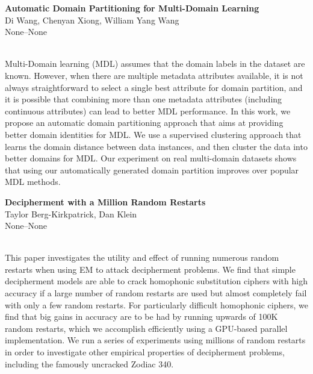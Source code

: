 \documentclass[twoside,makeidx]{book}
\begin{document}
\par\vspace{2em}\noindent%
\begin{minipage}{\linewidth}%
\begin{center}
\textbf{\normalsize Automatic Domain Partitioning for Multi-Domain Learning}\\
\normalsize  Di Wang,  Chenyan Xiong,  William Yang Wang\\
{\small None--None}\\
\end{center}
\end{minipage}\\[0.5em]
\nopagebreak%
\noindent%
{\small Multi-Domain learning (MDL) assumes that the domain labels in the dataset are known. However, when there are multiple metadata attributes available, it is not always straightforward to select a single best attribute for domain partition, and it is possible that combining more than one metadata attributes (including continuous attributes) can lead to better MDL performance. In this work, we propose an automatic domain partitioning approach that aims at providing better domain identities for MDL. We use a supervised clustering approach that learns the domain distance between data instances, and then cluster the data into better domains for MDL. Our experiment on real multi-domain datasets shows that using our automatically generated domain partition improves over popular MDL methods.}
\par\vspace{2em}\noindent%
\begin{minipage}{\linewidth}%
\begin{center}
\textbf{\normalsize Decipherment with a Million Random Restarts}\\
\normalsize  Taylor Berg-Kirkpatrick,  Dan Klein\\
{\small None--None}\\
\end{center}
\end{minipage}\\[0.5em]
\nopagebreak%
\noindent%
{\small This paper investigates the utility and effect of running numerous random restarts when using EM to attack decipherment problems. We find that simple decipherment models are able to crack homophonic substitution ciphers with high accuracy if a large number of random restarts are used but almost completely fail with only a few random restarts. For particularly difficult homophonic ciphers, we find that big gains in accuracy are to be had by running upwards of 100K random restarts, which we accomplish efficiently using a GPU-based parallel implementation. We run a series of experiments using millions of random restarts in order to investigate other empirical properties of decipherment problems, including the famously uncracked Zodiac 340.}
\end{document}
